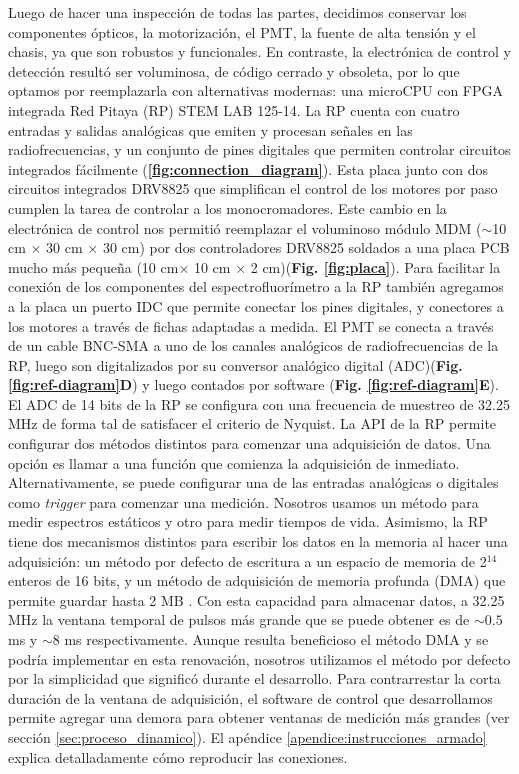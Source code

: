 Luego de hacer una inspección de todas las partes, decidimos conservar los componentes ópticos, la motorización, el PMT, la fuente de alta tensión y el chasis, ya que son robustos y funcionales.  
En contraste, la electrónica de control y detección resultó ser voluminosa, de código cerrado y obsoleta, por lo que optamos por reemplazarla con alternativas modernas: una microCPU con FPGA integrada Red Pitaya (RP) STEM LAB 125-14.
La RP cuenta con cuatro entradas y salidas analógicas que emiten y procesan señales en las radiofrecuencias, y un conjunto de pines digitales que permiten controlar circuitos integrados fácilmente (\textbf{\ref{fig:connection_diagram}}).
Esta placa junto con dos circuitos integrados DRV8825 que simplifican el control de los motores por paso cumplen la tarea de controlar a los monocromadores.
Este cambio en la electrónica de control nos permitió reemplazar el voluminoso módulo MDM ($\sim$10 cm $\times$ 30 cm $\times$ 30 cm) por dos controladores DRV8825 soldados a una placa PCB mucho más pequeña (10 cm$\times$ 10 cm $\times$ 2 cm)(\textbf{Fig. \ref{fig:placa}}).
Para facilitar la conexión de los componentes del espectrofluorímetro a la RP también agregamos a la placa un puerto IDC que permite conectar los pines digitales, y conectores a los motores a través de fichas adaptadas a medida.
El PMT se conecta a través de un cable BNC-SMA a uno de los canales analógicos de radiofrecuencias de la RP, luego son digitalizados por su conversor analógico digital (ADC)(\textbf{Fig. \ref{fig:ref-diagram}D}) y luego contados por software (\textbf{Fig. \ref{fig:ref-diagram}E}).
El ADC de 14 bits de la RP se configura con una frecuencia de muestreo de 32.25 MHz de forma tal de satisfacer el criterio de Nyquist.
La API de la RP permite configurar dos métodos distintos para comenzar una adquisición de datos.
Una opción es llamar a una función que comienza la adquisición de inmediato.
Alternativamente, se puede configurar una de las entradas analógicas o digitales como \textit{trigger} para comenzar una medición.
Nosotros usamos un método para medir espectros estáticos y otro para medir tiempos de vida.
Asimismo, la RP tiene dos mecanismos distintos para escribir los datos en la memoria al hacer una adquisición: un método por defecto de escritura a un espacio de memoria de 2$^{14}$ enteros de 16 bits, y un método de adquisición de memoria profunda (DMA) que permite guardar hasta 2 MB \cite{DMA_rp}.
Con esta capacidad para almacenar datos, a 32.25 MHz la ventana temporal de pulsos más grande que se puede obtener es de $\sim 0.5$ ms y $\sim 8$ ms respectivamente.
Aunque resulta beneficioso el método DMA y se podría implementar en esta renovación, nosotros utilizamos el método por defecto por la simplicidad que significó durante el desarrollo.
Para contrarrestar la corta duración de la ventana de adquisición, el software de control que desarrollamos permite agregar una demora para obtener ventanas de medición más grandes (ver sección \ref{sec:proceso_dinamico}).
El apéndice \ref{apendice:instrucciones_armado} explica detalladamente cómo reproducir las conexiones.

